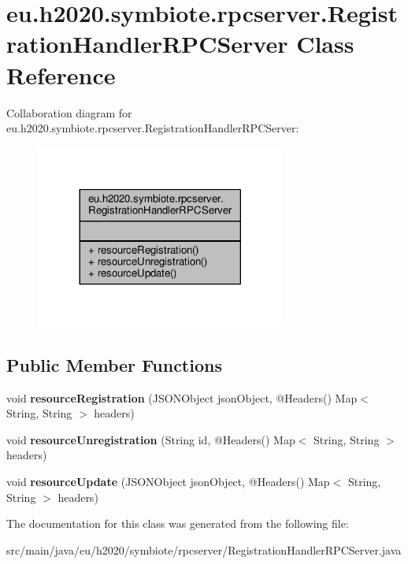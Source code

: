 \hypertarget{classeu_1_1h2020_1_1symbiote_1_1rpcserver_1_1RegistrationHandlerRPCServer}{}\section{eu.\+h2020.\+symbiote.\+rpcserver.\+Registration\+Handler\+R\+P\+C\+Server Class Reference}
\label{classeu_1_1h2020_1_1symbiote_1_1rpcserver_1_1RegistrationHandlerRPCServer}


Collaboration diagram for eu.\+h2020.\+symbiote.\+rpcserver.\+Registration\+Handler\+R\+P\+C\+Server\+:\nopagebreak
\begin{figure}[H]
\begin{center}
\leavevmode
\includegraphics[width=233pt]{classeu_1_1h2020_1_1symbiote_1_1rpcserver_1_1RegistrationHandlerRPCServer__coll__graph}
\end{center}
\end{figure}
\subsection*{Public Member Functions}
\begin{DoxyCompactItemize}
\item 
\mbox{\label{classeu_1_1h2020_1_1symbiote_1_1rpcserver_1_1RegistrationHandlerRPCServer_a59d3a42c7b9a1b51b7956226abc1d66e}} 
void {\bfseries resource\+Registration} (J\+S\+O\+N\+Object json\+Object, @Headers() Map$<$ String, String $>$ headers)
\item 
\mbox{\label{classeu_1_1h2020_1_1symbiote_1_1rpcserver_1_1RegistrationHandlerRPCServer_acbb159563455460f6a3da99e5353d11a}} 
void {\bfseries resource\+Unregistration} (String id, @Headers() Map$<$ String, String $>$ headers)
\item 
\mbox{\label{classeu_1_1h2020_1_1symbiote_1_1rpcserver_1_1RegistrationHandlerRPCServer_add97d8f15845030d4f09f7db65107bec}} 
void {\bfseries resource\+Update} (J\+S\+O\+N\+Object json\+Object, @Headers() Map$<$ String, String $>$ headers)
\end{DoxyCompactItemize}


The documentation for this class was generated from the following file\+:\begin{DoxyCompactItemize}
\item 
src/main/java/eu/h2020/symbiote/rpcserver/Registration\+Handler\+R\+P\+C\+Server.\+java\end{DoxyCompactItemize}
